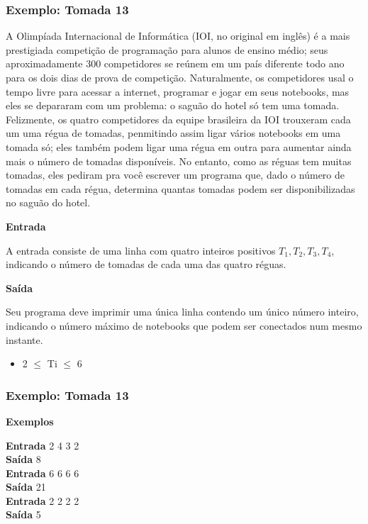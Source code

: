 \begin{frame}
  \frametitle{Exemplo: Tomada 13}
  \label{example:tomada-13}
  
  \scriptsize A Olimpíada Internacional de Informática (IOI, no original em inglês) é a mais prestigiada competição de programação para alunos de ensino médio; seus aproximadamente 300 competidores se reúnem em um país diferente todo ano para os dois dias de prova de competição. Naturalmente, os competidores usal o tempo livre para  acessar a internet, programar e jogar em seus notebooks, mas eles se depararam com um problema: o saguão do hotel só tem uma tomada.\\
  \scriptsize Felizmente, os quatro competidores da equipe brasileira da IOI trouxeram cada um uma régua de tomadas, penmitindo assim ligar vários notebooks em uma tomada só; eles também podem ligar uma régua em outra para aumentar ainda mais o número de tomadas disponíveis. No entanto, como as réguas tem muitas tomadas, eles pediram pra você escrever um programa que, dado o número de tomadas em cada régua, determina quantas tomadas podem ser disponibilizadas no saguão do hotel.\\
  \begin{center}
    \textbf{Entrada}
  \end{center}
  \scriptsize A entrada consiste de uma linha com quatro inteiros positivos \begin{math}T_1, T_2, T_3, T_4\end{math}, indicando o número de tomadas de cada uma das quatro réguas.
  \begin{center}
    \textbf{Saída}
  \end{center}
  \scriptsize Seu programa deve imprimir uma única linha contendo um único número inteiro, indicando o número máximo de notebooks que podem ser conectados num mesmo instante.
  \begin{itemize}
    \item 2 $\leq$ Ti $\leq$ 6
  \end{itemize}
\end{frame}

\begin{frame}
  \frametitle{Exemplo: Tomada 13}
  \begin{center}
    \textbf{Exemplos}
  \end{center}
  \textbf{Entrada}
    2	4	3	2\\
  \textbf{Saída}
    8\\
  \textbf{Entrada}
    6	6	6	6\\
  \textbf{Saída}
    21\\
  \textbf{Entrada}
    2	2	2	2\\
  \textbf{Saída}
    5
\end{frame}